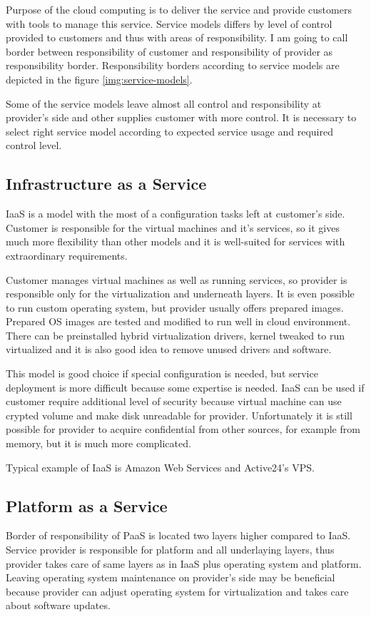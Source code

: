 
Purpose of the cloud computing is to deliver the service and provide customers with tools to manage this service. Service models differs by level of control provided to customers and thus with areas of responsibility. I am going to call border between responsibility of customer and responsibility of provider as responsibility border. Responsibility borders according to service models are depicted in the figure \ref{img:service-models}.

Some of the service models leave almost all control and responsibility at provider's side and other supplies customer with more control. It is necessary to select right service model according to expected service usage and required control level.

\subsection{Infrastructure as a Service}
\Ac{IaaS} is a model with the most of a configuration tasks left at customer's side. Customer is responsible for the virtual machines and it's services, so it gives much more flexibility than other models and it is well-suited for services with extraordinary requirements. 

Customer manages virtual machines as well as running services, so provider is responsible only for the virtualization and underneath layers. It is even possible to run custom operating system, but provider usually offers prepared images. Prepared \Ac{OS} images are tested and modified to run well in cloud environment. There can be preinstalled hybrid virtualization drivers, kernel tweaked to run virtualized and it is also good idea to remove unused drivers and software. 

This model is good choice if special configuration is needed, but service deployment is more difficult because some expertise is needed. \Ac{IaaS} can be used if customer require additional level of security because virtual machine can use crypted volume and make disk unreadable for provider. Unfortunately it is still possible for provider to acquire confidential from other sources, for example from memory, but it is much more complicated.

Typical example of \Ac{IaaS} is Amazon Web Services and Active24's VPS.

\subsection{Platform as a Service}
Border of responsibility of \Ac{PaaS} is located two layers higher compared to \Ac{IaaS}. Service provider is responsible for platform and all underlaying layers, thus provider takes care of same layers as in \Ac{IaaS} plus operating system and platform. 
Leaving operating system maintenance on provider's side may be beneficial because provider can adjust operating system for virtualization and takes care about software updates. 

